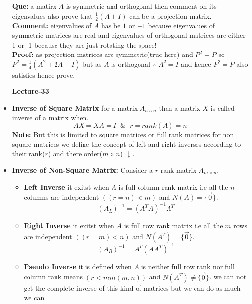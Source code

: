 \documentclass[a4paper,11pt]{article}
\numberwithin{equation}{section}
\begin{document}
\begin{itemize}
\textbf{Que: }a matirx $A$ is symmetric and orthogonal then comment on its eigenvalues also prove that $\frac{1}{2}(A+I)$ can be a projection matrix.\\

\textbf{Comment: }eigenvalues of $A$ has be $1$ or $-1$ because eigenvalues of symmetric matrices are real and eigenvalues of orthogonal matrices are either 1 or -1 because they are just rotating the space!\\

\textbf{Proof: }as projection matrices are symmetric(true here) and $P^2=P$ so $P^2=\frac{1}{4}\left(A^2+2A+I\right)$ but as $A$ is orthogonal $\therefore \hspace{4pt} A^2=I$ and hence $P^2=P$ also satisfies hence prove.\\

\begin{center}
    \Huge{\textbf{Lecture-33}}
\end{center}
\vspace{5pt}

\item \textbf{Inverse of Square Matrix} for a matrix $A_{n\times n}$ then a matrix $X$ is called inverse of a matrix when.\[\boxed{AX=XA=I} \hspace{7pt}\& \hspace{7pt} \boxed{r=rank(A)=n}\]
\textbf{Note: }But this is limited to square matrices or full rank matrices for non square matrices we define the concept of left and right inverses according to their rank($r$) and there order($m\times n$) $\downarrow$.\\

\item \textbf{Inverse of Non-Square Matrix:} Consider a $r$-rank matrix $A_{m\times n}$.
    \begin{itemize}
        \item \textbf{Left Inverse} it exitst when $A$ is full column rank matrix i.e all the $n$ columns are independent $({(r=n)<m})$ and $N(A)=\{\vec{0}\}$.
        \begin{equation}
            \boxed{{(A_{L})}^{-1}=(A^TA)^{-1}A^T} \tag{Left Inverse}
        \end{equation}
        \item \textbf{Right Inverse} it exitst when $A$ is full row rank matrix i.e all the $m$ rows are independent $({(r=m)<n})$ and $N(A^T)=\{\vec{0}\}$.
        \begin{equation}
            \boxed{{(A_{R})}^{-1}=A^T(AA^T)^{-1}} \tag{Right Inverse}
        \end{equation} 
        \item \textbf{Pseudo Inverse} it is defined when $A$ is neither full row rank nor full column rank means $({r<min(m,n)})$ and $N(A^T)\neq \{\vec{0}\}$.
        we can not get the complete inverse of this kind of matrices but we can do as much we can\\


\end{itemize}
\end{itemize}
\end{document}
